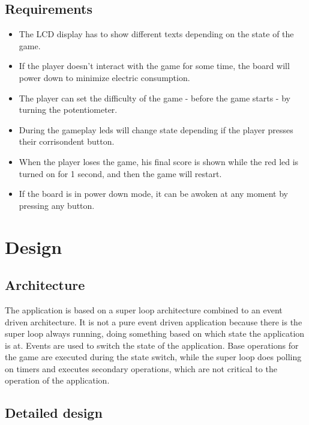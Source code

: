 \documentclass[a4paper,12pt]{report}
\begin{document}
        
    \section{Requirements}
    
        \begin{itemize}
            \item The LCD display has to show different texts depending on the state of the game.
            \item If the player doesn't interact with the game for some time, the board will power down to minimize electric consumption.
            \item The player can set the difficulty of the game - before the game starts - by turning the potentiometer.
            \item During the gameplay leds will change state depending if the player presses their corrisondent button. 
            \item When the player loses the game, his final score is shown while the red led is turned on for 1 second, and then the game will restart. 
            \item If the board is in power down mode, it can be awoken at any moment by pressing any button.
        \end{itemize}
    

\chapter{Design}

    \section{Architecture}

    The application is based on a super loop architecture combined to an event driven architecture.
    \newline 
    It is not a pure event driven application because there is the super loop always running, doing something based on which state the application is at. Events are used to switch the state of the application. Base operations for the game are executed during the state switch, while the super loop does polling on timers and executes secondary operations, which are not critical to the operation of the application. 
    
    
    \section{Detailed design}
    
\end{document}
